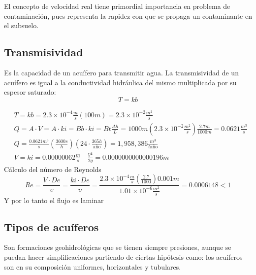 El concepto de velocidad real tiene primordial importancia en problema de contaminación, pues representa la rapidez con que se propaga un contaminante en el subsuelo.

\subsection{Transmisividad}
Es la capacidad de un acuífero para transmitir agua. La transmisividad de un acuífero es igual a la conductividad hidráulica del mismo multiplicada por su espesor saturado:
\begin{equation}
    T = kb
\end{equation}

\begin{align*}
    &T = kb =2.3\times 10^{- 4} \frac{m}{s}(100m) = 2.3\times 10^{ - 2}\frac{m^2}{s}\\
    &Q = A\cdot V = A\cdot ki = Bb\cdot ki = Bt\frac{\Delta h}{L} = 1000m\left( 2.3\times10^{ - 2} \frac{m^2}{s}\right)\frac{2.7m}{1000m} = 0.0621\frac{m^3}{s}\\ 
    &Q = \frac{0.0621m^3}{s}\left(\frac{3600s}{h}\right)\left(24\cdot\frac{365h}{\text{año}}\right) = 1 ,958,386\frac{m^3}{t\text{año}}\\
    &V = ki = 0.00000062\frac{m}{s}\quad \frac{V^2}{2g} = 0.0000000000000196m
\end{align*}
Cálculo del número de Reynolds
\begin{equation*}
    Re = \frac{V\cdot De}{\upsilon} =\frac{ki\cdot De}{\upsilon} =\frac{2.3\times 10^{ - 4} \frac{m}{s}\left(\frac{2.7}{1000}\right)0.001m}{1.01\times 10^{ - 6} \frac{m^2}{s}} = 0.0006148 < 1
\end{equation*}
Y por lo tanto el flujo es laminar
\subsection{Tipos de acuíferos}
Son formaciones geohidrológicas que se tienen siempre presiones, aunque se puedan hacer simplificaciones partiendo de ciertas hipótesis como: los acuíferos son en su composición uniformes, horizontales y tubulares.

